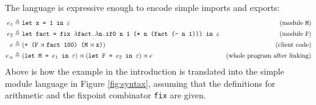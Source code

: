 \documentclass[acmsmall,screen,review]{acmart}\settopmatter{printfolios=true,printccs=false,printacmref=false}
\theoremstyle{acmdefinition}
\newcommand*{\synlink}{\rtimes}
\begin{document}
The language is expressive enough to encode simple imports and exports:
{ \footnotesize
\begin{align*}
  e_1          & \triangleq\text{\texttt{let x = 1 in }}\varepsilon                                                                                                   & (\text{module \texttt{M}})           \\
  e_2          & \triangleq\text{\texttt{let fact = fix }}\lambda\text{\texttt{fact.}}\lambda\text{\texttt{n.if0 n 1 (* n (fact (- n 1))) in }}\varepsilon            & (\text{module \texttt{F}})           \\
  e            & \triangleq(\text{\texttt{+ (F}}\synlink\text{\texttt{fact 100) (M}}\synlink\text{\texttt{x)}})                                                       & (\text{client code})                 \\
  e_{\synlink} & \triangleq(\text{\texttt{let M = }}e_1\text{\texttt{ in }}\varepsilon)\synlink(\text{\texttt{let F = }}e_2\text{\texttt{ in }}\varepsilon)\synlink e & (\text{whole program after linking})
\end{align*}}%
Above is how the example in the introduction is translated into the simple module language in Figure \ref{fig:syntax}, assuming that the definitions for arithmetic and the fixpoint combinator \texttt{fix} are given.
\end{document}

